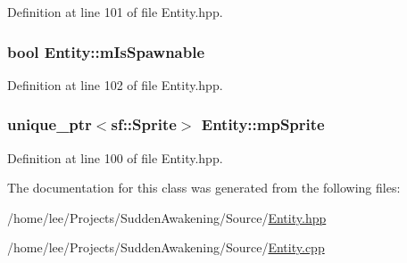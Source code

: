 Definition at line 101 of file Entity.\-hpp.

\hypertarget{class_entity_a13cc8677fa51642cc3d60c13e9566dab}{
\subsubsection[{m\-Is\-Spawnable}]{\setlength{\rightskip}{0pt plus 5cm}bool Entity\-::m\-Is\-Spawnable\hspace{0.3cm}{\ttfamily [protected]}}}\label{class_entity_a13cc8677fa51642cc3d60c13e9566dab}


Definition at line 102 of file Entity.\-hpp.

\hypertarget{class_entity_a52b9048640f6ffadfbc3e93d6184fe1f}{
\subsubsection[{mp\-Sprite}]{\setlength{\rightskip}{0pt plus 5cm}unique\-\_\-ptr$<$sf\-::\-Sprite$>$ Entity\-::mp\-Sprite\hspace{0.3cm}{\ttfamily [protected]}}}\label{class_entity_a52b9048640f6ffadfbc3e93d6184fe1f}


Definition at line 100 of file Entity.\-hpp.



The documentation for this class was generated from the following files\-:\begin{DoxyCompactItemize}
\item 
/home/lee/\-Projects/\-Sudden\-Awakening/\-Source/\hyperlink{_entity_8hpp}{Entity.\-hpp}\item 
/home/lee/\-Projects/\-Sudden\-Awakening/\-Source/\hyperlink{_entity_8cpp}{Entity.\-cpp}\end{DoxyCompactItemize}
